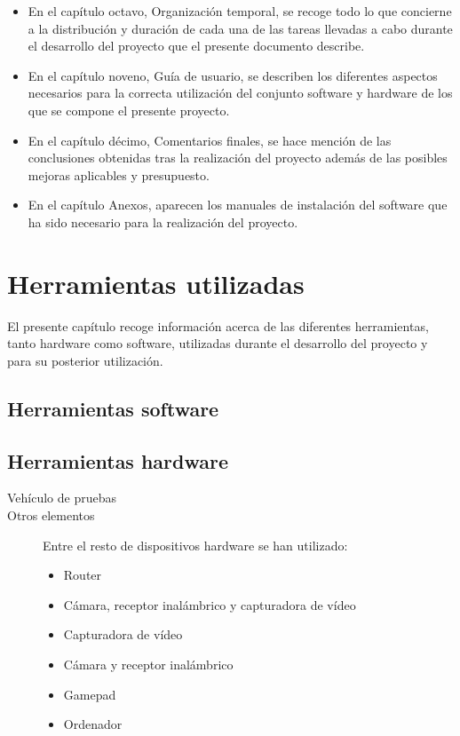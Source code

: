 \documentclass[a4paper,12pt]{article}
\begin{document}
\begin{itemize}
\item En el capítulo octavo, Organización temporal, se recoge todo lo que concierne a la distribución y duración de cada una de las tareas llevadas a cabo durante el desarrollo del proyecto que el presente documento describe.

\item En el capítulo noveno, Guía de usuario, se describen los diferentes aspectos necesarios para la correcta utilización del conjunto software y hardware de los que se compone el presente proyecto.

\item En el capítulo décimo, Comentarios finales, se hace mención de las conclusiones obtenidas tras la realización del proyecto además de las posibles mejoras aplicables y presupuesto.

\item En el capítulo Anexos, aparecen los manuales de instalación del software que ha sido necesario para la realización del proyecto.

\end{itemize}




\section{Herramientas utilizadas}

El presente capítulo recoge información acerca de las diferentes herramientas, tanto hardware como software, utilizadas durante el desarrollo del proyecto y para su posterior utilización. 

\subsection {Herramientas software}


\subsection{Herramientas hardware}

\begin{description}
\item [Vehículo de pruebas ]


\item [Otros elementos]

Entre el resto de dispositivos hardware se han utilizado:

\begin{itemize}
\item Router
\item Cámara, receptor inalámbrico y capturadora de vídeo
\item Capturadora de vídeo
\item Cámara y receptor inalámbrico
\item Gamepad
\item Ordenador
\end{itemize}

\end{description}
\end{document}
